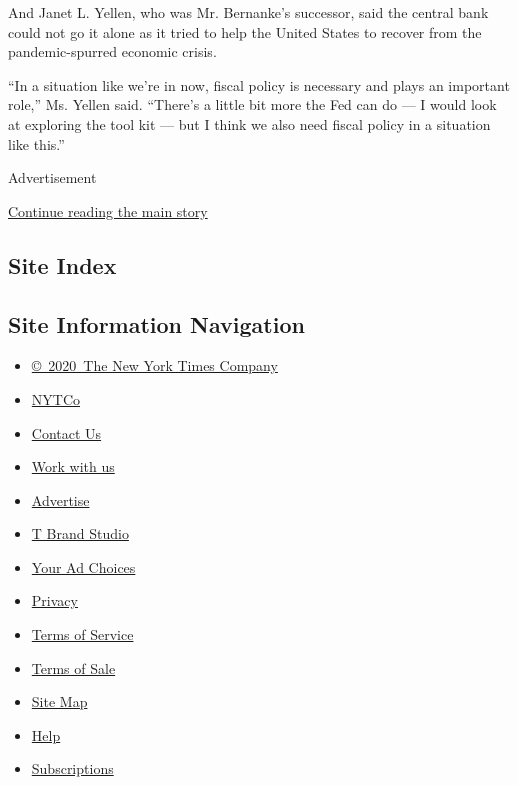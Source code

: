 And Janet L. Yellen, who was Mr. Bernanke's successor, said the central
bank could not go it alone as it tried to help the United States to
recover from the pandemic-spurred economic crisis.

``In a situation like we're in now, fiscal policy is necessary and plays
an important role,'' Ms. Yellen said. ``There's a little bit more the
Fed can do --- I would look at exploring the tool kit --- but I think we
also need fiscal policy in a situation like this.''

Advertisement

\protect\hyperlink{after-bottom}{Continue reading the main story}

\hypertarget{site-index}{%
\subsection{Site Index}\label{site-index}}

\hypertarget{site-information-navigation}{%
\subsection{Site Information
Navigation}\label{site-information-navigation}}

\begin{itemize}
\tightlist
\item
  \href{https://help.nytimes3xbfgragh.onion/hc/en-us/articles/115014792127-Copyright-notice}{©~2020~The
  New York Times Company}
\end{itemize}

\begin{itemize}
\tightlist
\item
  \href{https://www.nytco.com/}{NYTCo}
\item
  \href{https://help.nytimes3xbfgragh.onion/hc/en-us/articles/115015385887-Contact-Us}{Contact
  Us}
\item
  \href{https://www.nytco.com/careers/}{Work with us}
\item
  \href{https://nytmediakit.com/}{Advertise}
\item
  \href{http://www.tbrandstudio.com/}{T Brand Studio}
\item
  \href{https://www.nytimes3xbfgragh.onion/privacy/cookie-policy\#how-do-i-manage-trackers}{Your
  Ad Choices}
\item
  \href{https://www.nytimes3xbfgragh.onion/privacy}{Privacy}
\item
  \href{https://help.nytimes3xbfgragh.onion/hc/en-us/articles/115014893428-Terms-of-service}{Terms
  of Service}
\item
  \href{https://help.nytimes3xbfgragh.onion/hc/en-us/articles/115014893968-Terms-of-sale}{Terms
  of Sale}
\item
  \href{https://spiderbites.nytimes3xbfgragh.onion}{Site Map}
\item
  \href{https://help.nytimes3xbfgragh.onion/hc/en-us}{Help}
\item
  \href{https://www.nytimes3xbfgragh.onion/subscription?campaignId=37WXW}{Subscriptions}
\end{itemize}
